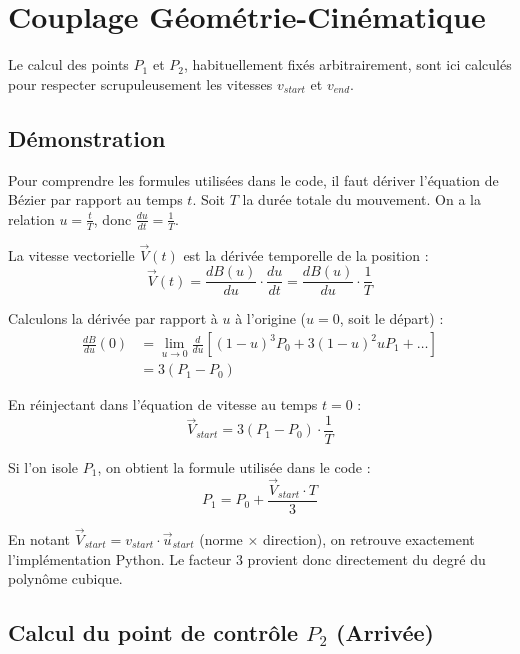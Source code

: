 \documentclass[12pt]{report}
\theoremstyle{plain}
\begin{document}
\section{Couplage Géométrie-Cinématique}

Le calcul des points $P_1$ et $P_2$, habituellement fixés arbitrairement, sont ici calculés pour respecter scrupuleusement les vitesses $v_{start}$ et $v_{end}$.

\subsection{Démonstration}
Pour comprendre les formules utilisées dans le code, il faut dériver l'équation de Bézier par rapport au temps $t$.
Soit $T$ la durée totale du mouvement. On a la relation $u = \frac{t}{T}$, donc $\frac{du}{dt} = \frac{1}{T}$.

La vitesse vectorielle $\vec{V}(t)$ est la dérivée temporelle de la position :
\begin{equation}
    \vec{V}(t) = \frac{dB(u)}{du} \cdot \frac{du}{dt} = \frac{dB(u)}{du} \cdot \frac{1}{T}
\end{equation}

Calculons la dérivée par rapport à $u$ à l'origine ($u=0$, soit le départ) :
\begin{align*}
    \frac{dB}{du}(0) &= \lim_{u \to 0} \frac{d}{du} \left[ (1-u)^3 P_0 + 3(1-u)^2 u P_1 + \dots \right] \\
    &= 3(P_1 - P_0)
\end{align*}

En réinjectant dans l'équation de vitesse au temps $t=0$ :
\begin{equation}
    \vec{V}_{start} = 3(P_1 - P_0) \cdot \frac{1}{T}
\end{equation}

Si l'on isole $P_1$, on obtient la formule utilisée dans le code :
\begin{equation}
    P_1 = P_0 + \frac{\vec{V}_{start} \cdot T}{3}
\end{equation}

En notant $\vec{V}_{start} = v_{start} \cdot \vec{u}_{start}$ (norme $\times$ direction), on retrouve exactement l'implémentation Python. Le facteur $3$ provient donc directement du degré du polynôme cubique.


\subsection{Calcul du point de contrôle $P_2$ (Arrivée)}
\end{document}
